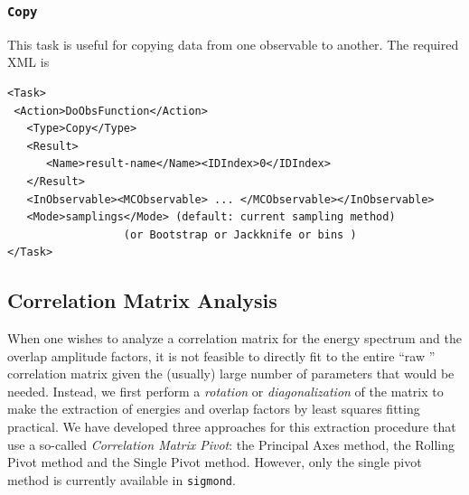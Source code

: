 \documentclass[12pt]{article}
\newcommand{\vb}{\texttt}
\begin{document}
\subsubsection{\vb{Copy}}                                                                      
This task is useful for copying data from one observable to another.
The required XML is                      
\begin{verbatim}
<Task>                                                                   
 <Action>DoObsFunction</Action>                                          
   <Type>Copy</Type>                                                     
   <Result>                                                              
      <Name>result-name</Name><IDIndex>0</IDIndex>                       
   </Result>                                                             
   <InObservable><MCObservable> ... </MCObservable></InObservable>       
   <Mode>samplings</Mode> (default: current sampling method)             
                  (or Bootstrap or Jackknife or bins )                   
</Task>                                                                  
\end{verbatim}



\subsection{Correlation Matrix Analysis} 
\label{sec:corrmatanal}
When one wishes to analyze a correlation matrix for the energy spectrum and
the overlap amplitude factors, it is not feasible to directly fit to the entire
``raw '' correlation matrix given the (usually) large number of parameters that
would be needed.  Instead, we first perform a \textit{rotation} or \textit{diagonalization}
of the matrix to make the extraction of energies and overlap factors by least squares 
fitting practical. We have developed three approaches for this extraction procedure that 
use a so-called \textit{Correlation Matrix Pivot}: the Principal Axes method, the
Rolling Pivot method and the Single Pivot method.  However, only the single pivot
method is currently available in \vb{sigmond}.
\end{document}
